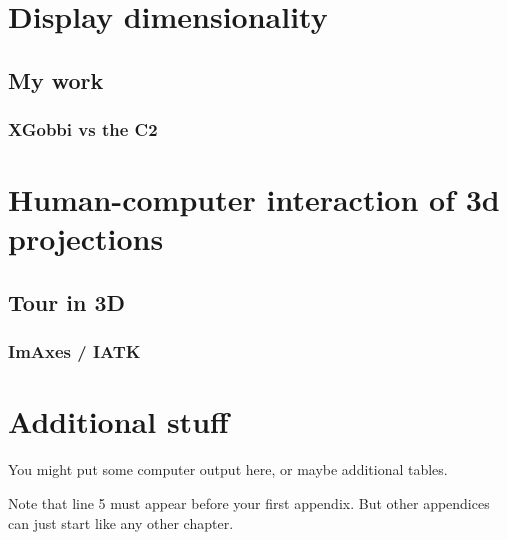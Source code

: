 \documentclass{monashthesis}
\theoremstyle{definition}
\theoremstyle{definition}
\theoremstyle{definition}
\theoremstyle{remark}
\begin{document}
\chapter{Display dimensionality}\label{ch:disp_dim}

\section{My work}\label{my-work}

\subsection{XGobbi vs the C2}\label{xgobbi-vs-the-c2}

\chapter{Human-computer interaction of 3d
projections}\label{ch:hci_3dproj}

\section{Tour in 3D}\label{tour-in-3d}

\subsection{ImAxes / IATK}\label{imaxes-iatk}

\appendix

\chapter{Additional stuff}\label{additional-stuff}

You might put some computer output here, or maybe additional tables.

Note that line 5 must appear before your first appendix. But other
appendices can just start like any other chapter.

\printbibliography[heading=bibintoc]
\end{document}
